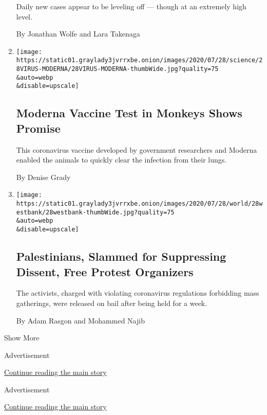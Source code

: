 \begin{enumerate}
  Daily new cases appear to be leveling off --- though at an extremely
  high level.

  By Jonathan Wolfe and Lara Takenaga
\item
  \href{/2020/07/28/health/coronavirus-moderna-vaccine-monkeys.html}{}

  \texttt{[image: https://static01.graylady3jvrrxbe.onion/images/2020/07/28/science/28VIRUS-MODERNA/28VIRUS-MODERNA-thumbWide.jpg?quality=75\\\&auto=webp\\\&disable=upscale]}

  \hypertarget{moderna-vaccine-test-in-monkeys-shows-promise}{%
  \subsection{Moderna Vaccine Test in Monkeys Shows
  Promise}\label{moderna-vaccine-test-in-monkeys-shows-promise}}

  This coronavirus vaccine developed by government researchers and
  Moderna enabled the animals to quickly clear the infection from their
  lungs.

  By Denise Grady
\item
  \href{/2020/07/28/world/middleeast/west-bank-protest-activists.html}{}

  \texttt{[image: https://static01.graylady3jvrrxbe.onion/images/2020/07/28/world/28westbank/28westbank-thumbWide.jpg?quality=75\\\&auto=webp\\\&disable=upscale]}

  \hypertarget{palestinians-slammed-for-suppressing-dissent-free-protest-organizers}{%
  \subsection{Palestinians, Slammed for Suppressing Dissent, Free
  Protest
  Organizers}\label{palestinians-slammed-for-suppressing-dissent-free-protest-organizers}}

  The activists, charged with violating coronavirus regulations
  forbidding mass gatherings, were released on bail after being held for
  a week.

  By Adam Rasgon and Mohammed Najib
\end{enumerate}

Show More

Advertisement

\protect\hyperlink{after-mid4}{Continue reading the main story}

Advertisement

\protect\hyperlink{after-mktg}{Continue reading the main story}

